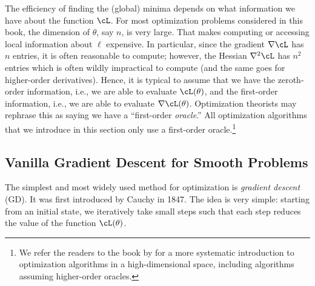 \documentclass[../../book-main.tex]{subfiles}
\begin{document}
The efficiency of finding the (global) minima depends on what information we have about the function \(\cL\). For most optimization problems considered in this book, the dimension of \(\theta\), say \(n\), is very large. That makes computing or accessing local information about \(\ell\) expensive. In particular, since the gradient \(\nabla \cL\) has \(n\) entries, it is often reasonable to compute; however, the Hessian \(\nabla^{2} \cL\) has \(n^{2}\) entries which is often wildly impractical to compute (and the same goes for higher-order derivatives). Hence, it is typical to assume that we have the zeroth-order information, i.e., we are able to evaluate \(\cL(\theta)\), and the first-order information, i.e., we are able to evaluate \(\nabla \cL(\theta)\). Optimization theorists may rephrase this as saying we have a ``first-order \textit{oracle}.'' All optimization algorithms that we introduce in this section only use a first-order oracle.\footnote{We refer the readers to the book by \cite{Wright-Ma-2022} for a more systematic introduction to optimization algorithms in a high-dimensional space, including algorithms assuming higher-order oracles.}  

\subsection{Vanilla Gradient Descent for Smooth Problems}

The simplest and most widely used method for optimization is \textit{gradient descent} (GD). It was first introduced by Cauchy in 1847. The idea is very simple: starting from an initial state, we iteratively take small steps such that each step reduces the value of the function $\cL(\theta)$. 
\end{document}
